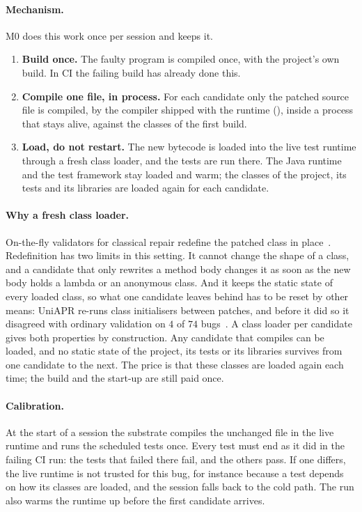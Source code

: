 \paragraph{Mechanism.} M0 does this work once per session and keeps it.
\begin{enumerate}
\item \textbf{Build once.} The faulty program is compiled once, with the
project's own build. In CI the failing build has already done this.
\item \textbf{Compile one file, in process.} For each candidate only the
patched source file is compiled, by the compiler shipped with the runtime
(), inside a process that stays alive, against the classes
of the first build.
\item \textbf{Load, do not restart.} The new bytecode is loaded into the live
test runtime through a fresh class loader, and the tests are run there. The
Java runtime and the test framework stay loaded and warm; the classes of the
project, its tests and its libraries are loaded again for each candidate.
\end{enumerate}

\paragraph{Why a fresh class loader.} On-the-fly validators for classical
repair redefine the patched class in place~\citep{chen2021uniapr}.
Redefinition has two limits in this setting. It cannot change the shape of a
class, and a candidate that only rewrites a method body changes it as soon as
the new body holds a lambda or an anonymous class. And it keeps the static
state of every loaded class, so what one candidate leaves behind has to be
reset by other means: UniAPR re-runs class initialisers between patches, and
before it did so it disagreed with ordinary validation on $4$ of $74$
bugs~\citep{chen2021uniapr}. A class loader per candidate gives both
properties by construction. Any candidate that compiles can be loaded, and no
static state of the project, its tests or its libraries survives from one
candidate to the next. The price is that these classes are loaded again each
time; the build and the start-up are still paid once.

\paragraph{Calibration.} At the start of a session the substrate compiles the
unchanged file in the live runtime and runs the scheduled tests once. Every
test must end as it did in the failing CI run: the tests that failed there
fail, and the others pass. If one differs, the live runtime is not trusted for
this bug, for instance because a test depends on how its classes are loaded,
and the session falls back to the cold path. The run also warms the runtime up
before the first candidate arrives.

